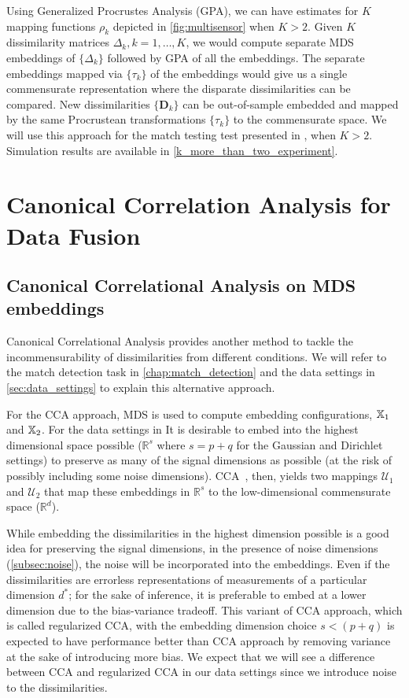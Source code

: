 \documentclass[12pt,oneside,final]{thesis}
\begin{document}
Using Generalized Procrustes Analysis (GPA), we can have estimates for $K$ mapping functions $\rho_k$ depicted in \ref{fig:multisensor} when $K>2$. Given $K$  dissimilarity matrices $\Delta_k,k=1,\ldots,K$,  we would compute separate  MDS embeddings of  $\{\Delta_k \}$  followed by GPA of all the embeddings. The separate embeddings mapped via $\{\tau_k \}$ of the embeddings would give us a single commensurate representation where the disparate dissimilarities can be compared. New dissimilarities $\{ \bm{D}_k \}$ can be out-of-sample embedded  and mapped by the same Procrustean transformations  $\{\tau_k \}$ to the commensurate space. We will use this approach  for the match testing test presented in \label{sec:match detection}, when $K>2$. Simulation results are available in \ref{k_more_than_two_experiment}.






\chapter{Canonical Correlation Analysis for Data Fusion}
\label{chap:CCA}

\section{Canonical Correlational Analysis on MDS embeddings\label{sec:CCA}}

Canonical Correlational Analysis provides another method to tackle the incommensurability of dissimilarities from different conditions. We will refer to the match detection task in \autoref{chap:match_detection} and the data settings in \autoref{sec:data_settings} to explain this alternative approach.

For the CCA approach, MDS is used  to compute embedding configurations, $ \mathbb{X}_1$ and $\mathbb{X}_2$. For the data settings in  It is desirable to  embed into the highest dimensional space  possible ($\mathbb{R}^{s}$ where $s=p+q$ for the Gaussian and Dirichlet settings)  to  preserve as many of the signal dimensions as possible (at the risk of possibly including  some noise dimensions). CCA~\cite{Hardoon2004}, then,  yields two mappings $\mathcal{U}_1$ and $\mathcal{U}_2$ that map these embeddings in $\mathbb{R}^{s}$ to  the low-dimensional commensurate space ($\mathbb{R}^d$). 

While embedding the dissimilarities in the  highest dimension possible is a good idea for preserving the signal dimensions, in the presence of noise dimensions (\ref{subsec:noise}), the noise will be incorporated into the embeddings. Even if the dissimilarities are errorless representations of measurements of a particular dimension $d^*$; for  the  sake of inference, it is preferable to embed at a lower  dimension due to the bias-variance tradeoff. This variant of CCA approach, which is called regularized CCA, with the  embedding dimension choice $s< (p+q)$ is expected to have performance better than CCA approach by removing variance at the sake of introducing more bias. We expect that  we will see a difference between CCA and regularized CCA  in our data settings since we introduce noise to the dissimilarities.
\end{document}
